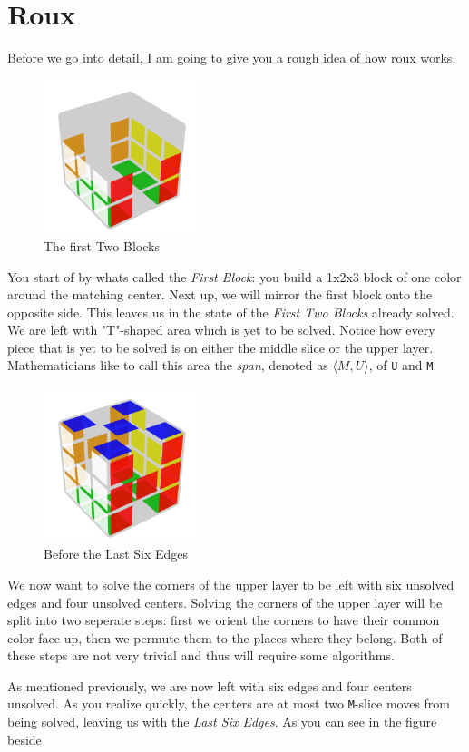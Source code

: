 \documentclass{scrreprt}
\begin{document}
\chapter{Roux}
Before we go into detail, I am going to give you a rough idea of how roux works.\par
\begin{figure}
\centering
\includegraphics[width=0.4\textwidth]{f2b_transparent.png}
\caption*{The first Two Blocks }
\end{figure}
You start of by whats called the \emph{First Block}: you build a 1x2x3 block of one color around the matching center. Next up, we will mirror the first block onto the opposite side. This leaves us in the state of the \emph{First Two Blocks} already solved. We are left with "T"-shaped area which is yet to be solved. Notice how every piece that is yet to be solved is on either the middle slice or the upper layer. Mathematicians like to call this area the \emph{span}, denoted as $\langle M, U \rangle$, of \texttt{U} and \texttt{M}.\par
\begin{figure}
\centering
\includegraphics[width=0.4\textwidth]{lse.png}
\caption*{Before the Last Six Edges}
\end{figure}
We now want to solve the corners of the upper layer to be left with six unsolved edges and four unsolved centers. Solving the corners of the upper layer will be split into two seperate steps: first we orient the corners to have their common color face up, then we permute them to the places where they belong. Both of these steps are not very trivial and thus will require some algorithms.\par
As mentioned previously, we are now left with six edges and four centers unsolved. As you realize quickly, the centers are at most two \texttt{M}-slice moves from being solved, leaving us with the \emph{Last Six Edges}. As you can see in the figure beside
\end{document}
